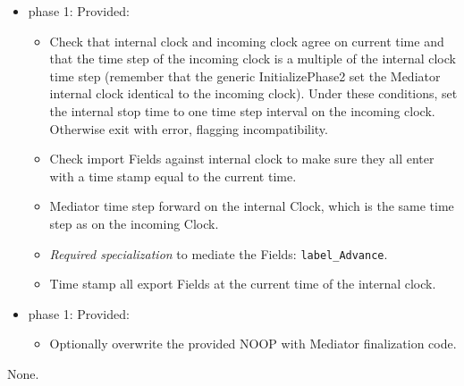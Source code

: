 \begin{itemize}
\item phase 1: {\sc Provided:}
  \begin{itemize}
  \item Check that internal clock and incoming clock agree on current time and that the time step of the incoming clock is a multiple of the internal clock time step (remember that the generic InitializePhase2 set the Mediator internal clock identical to the incoming clock). Under these conditions, set the internal stop time to one time step interval on the incoming clock. Otherwise exit with error, flagging incompatibility.
  \item Check import Fields against internal clock to make sure they all enter with a time stamp equal to the current time.
  \item Mediator time step forward on the internal Clock, which is the same time step as on the incoming Clock.
  \item {\it Required specialization} to mediate the Fields: {\tt label\_Advance}.
  \item Time stamp all export Fields at the current time of the internal clock.
  \end{itemize}    
\end{itemize}

\begin{itemize}
\item phase 1: {\sc Provided:}
  \begin{itemize}
  \item Optionally overwrite the provided NOOP with Mediator finalization code.
  \end{itemize}      
\end{itemize}

{\sc None.}

